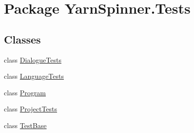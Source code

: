 \hypertarget{a00311}{\section{Package Yarn\-Spinner.\-Tests}
\label{a00311}
}
\subsection*{Classes}
\begin{DoxyCompactItemize}
\item 
class \hyperlink{a00072}{Dialogue\-Tests}
\item 
class \hyperlink{a00098}{Language\-Tests}
\item 
class \hyperlink{a00125}{Program}
\item 
class \hyperlink{a00128}{Project\-Tests}
\item 
class \hyperlink{a00144}{Test\-Base}
\end{DoxyCompactItemize}
